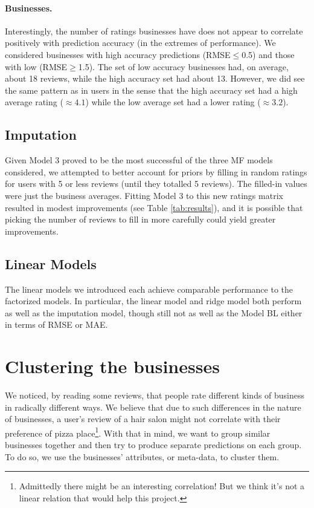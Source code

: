 \documentclass[12pt]{article}
\begin{document}
\paragraph{Businesses.} Interestingly, the number of ratings businesses have does not appear to correlate positively with prediction accuracy (in the extremes of performance). We considered businesses with high accuracy predictions (RMSE$\leq$0.5) and those with low (RMSE$\geq$1.5). The set of low accuracy businesses had, on average, about 18 reviews, while the high accuracy set had about 13. However, we did see the same pattern as in users in the sense that the high accuracy set had a high average rating ($\approx4.1$) while the low average set had a lower rating ($\approx3.2$).

\subsection{Imputation}  
Given Model 3 proved to be the most successful of the three MF models considered, we attempted to better account for priors by filling in random ratings for users with 5 or less reviews (until they totalled 5 reviews). The filled-in values were just the business averages. Fitting Model 3 to this new ratings matrix resulted in modest improvements (see Table \ref{tab:results}), and it is possible that picking the number of reviews to fill in more carefully could yield greater improvements. 

\subsection{Linear Models}
The linear models we introduced each achieve comparable performance to the factorized models. In particular, the linear model and ridge model both perform as well as the imputation model, though still not as well as the Model BL either in terms of RMSE or MAE.

\section{Clustering the businesses}\label{clust}
We noticed, by reading some reviews, that people rate different kinds of business in radically different ways. %
We believe that due to such differences in the nature of businesses, a user's review of a hair salon might not correlate with their preference of pizza place\footnote{Admittedly there might be an interesting correlation! But we think it's not a linear relation that would help this project.}.
With that in mind, we want to group similar businesses together and then try to produce separate predictions on each group. To do so, we use the businesses' attributes, or meta-data, to cluster them.
\end{document}
